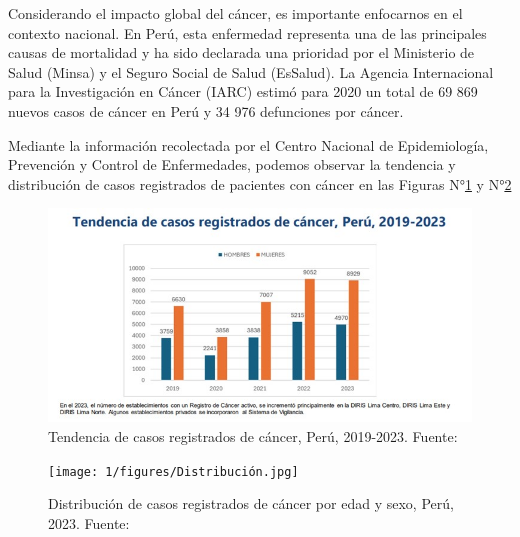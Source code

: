 Considerando el impacto global del cáncer, es importante enfocarnos en el contexto nacional. En Perú, esta enfermedad representa una de las principales causas de mortalidad y ha sido declarada una prioridad por el Ministerio de Salud (Minsa) y el Seguro Social de Salud (EsSalud). La Agencia Internacional para la Investigación en Cáncer (IARC) estimó para 2020 un total de 69 869 nuevos casos de cáncer en Perú y 34 976 defunciones por cáncer.

Mediante la información recolectada por el Centro Nacional de Epidemiología, Prevención y Control de Enfermedades, podemos observar la tendencia y distribución de casos registrados de pacientes con cáncer en las Figuras N°\ref{3:fig} y N°\ref{4:fig}

\begin{figure}[ht]
	\centering
	\includegraphics[width=1.1\textwidth]{1/figures/Tendencia.jpg}
	\caption{Tendencia de casos registrados de cáncer, Perú, 2019-2023. Fuente: \cite{cdc2023cancer}}
	\label{3:fig}
\end{figure}

\begin{figure}[h!]
	\centering
	\texttt{[image: 1/figures/Distribución.jpg]}
	\caption{Distribución de casos registrados de cáncer por edad y sexo, Perú, 2023. Fuente: \cite{cdc2023cancer}}
	\label{4:fig}
\end{figure}

